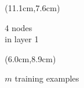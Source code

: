 \documentclass{beamer}
\begin{document}
{\begin{textblock*}{7.9cm}(11.1cm,7.6cm) %
\begin{scriptsize}
4 nodes\\ in layer 1\\
\end{scriptsize}
\end{textblock*}



\begin{textblock*}{7.9cm}(6.0cm,8.9cm) %
\begin{scriptsize}
$m$ training examples
\end{scriptsize}
\end{textblock*}

}
\end{document}

